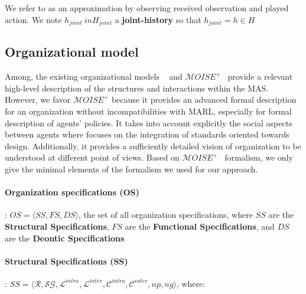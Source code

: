 \documentclass{ecai}
\begin{document}
We refer to  as an approximation by observing received observation and played action. We note $h_{joint} \ in H_{joint}$ a \textbf{joint-history} so that $h_{joint} = {h \in H}$

\subsection{Organizational model}

Among, the existing organizational models ~\citep{Ferber2004} and $\mathcal{M}OISE^+$~\citep{Hubner2002} provide a relevant high-level description of the structures and interactions within the MAS. However, we favor $\mathcal{M}OISE^+$ because it provides an advanced formal description for an organization without incompatibilities with MARL, especially for formal description of agents' policies. It takes into account explicitly the social aspects between agents where  focuses on the integration of standards oriented towards design. Additionally, it provides a sufficiently detailed vision of organization to be understood at different point of views.
Based on $\mathcal{M}OISE^+$~\citep{Hubner2007} formalism, we only give the minimal elements of the formalism we used for our approach.

\paragraph{\textbf{Organization specifications (OS)}}: $OS = \langle SS, FS, DS \rangle$, the set of all organization specifications, where $SS$ are the \textbf{Structural Specifications}, $FS$ are the \textbf{Functional Specifications}, and $DS$ are the \textbf{Deontic Specifications}

\paragraph{\textbf{Structural Specifications (SS)}}: $SS = \langle \mathcal{R}, \mathcal{SG}, \mathcal{L}^{intra}, \mathcal{L}^{inter}, \mathcal{C}^{intra}, \mathcal{C}^{inter}, np, ng \rangle$, where:
\end{document}
